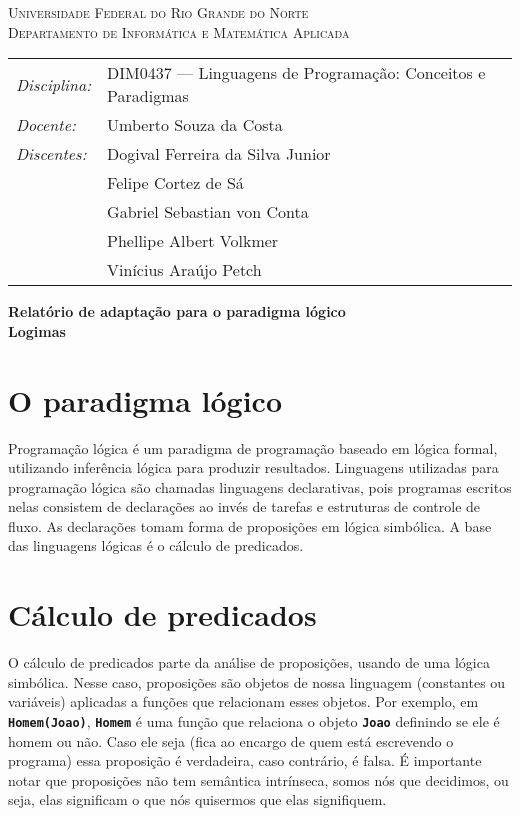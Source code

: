 \documentclass[12pt, a4paper]{article}
\newcommand{\inlinecode}[1]{\textbf{\lstinline{#1}}}
\begin{document}
\begin{center}
    \textsc{Universidade Federal do Rio Grande do Norte} \\
    \textsc{Departamento de Informática e Matemática Aplicada}
\end{center}

\bigskip

\begin{tabular}{@{}ll@{}}
    \emph{Disciplina:} & DIM0437 --- Linguagens de Programação:
                            Conceitos e Paradigmas \\
    \emph{Docente:}    & Umberto Souza da Costa \\
    \emph{Discentes:}  & Dogival Ferreira da Silva Junior \\
                       & Felipe Cortez de Sá \\
                       & Gabriel Sebastian von Conta \\
                       & Phellipe Albert Volkmer \\
                       & Vinícius Araújo Petch
\end{tabular}

\bigskip

\begin{center}
\large \textbf{Relatório de adaptação para o paradigma lógico \\ Logimas}
\end{center}

\bigskip

\section{O paradigma lógico}
Programação lógica é um paradigma de programação baseado em lógica
formal, utilizando inferência lógica para produzir resultados.
Linguagens utilizadas para programação lógica são chamadas linguagens
declarativas, pois programas escritos nelas consistem de declarações ao
invés de tarefas e estruturas de controle de fluxo. As declarações
tomam forma de proposições em lógica simbólica. A base das linguagens
lógicas é o cálculo de predicados.

\section{Cálculo de predicados}
O cálculo de predicados parte da análise de proposições, usando de uma
lógica simbólica. Nesse caso, proposições são objetos de nossa
linguagem (constantes ou variáveis) aplicadas a funções que relacionam
esses objetos. Por exemplo, em \inlinecode{Homem(Joao)},
\inlinecode{Homem} é uma função que relaciona o objeto
\inlinecode{Joao} definindo se ele é homem ou não. Caso ele seja
(fica ao encargo de quem está escrevendo o programa) essa proposição é
verdadeira, caso contrário, é falsa. É importante notar que proposições
não tem semântica intrínseca, somos nós que decidimos, ou seja, elas
significam o que nós quisermos que elas signifiquem.
\end{document}
